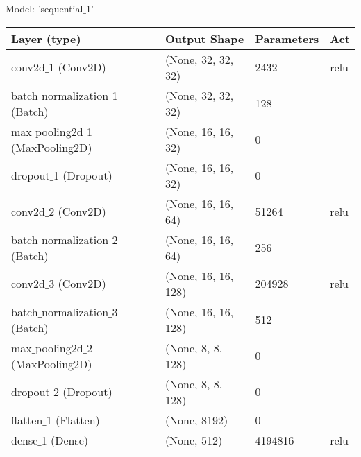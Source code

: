 \documentclass[a4paper,12pt]{article}
\begin{document}
\begin{center}
	Model: 'sequential$\_$1'
\begin{tabular}{|l l l l|}\hline
	\hline
	Layer (type)                  & Output Shape       & Parameters & Act\\ \hline \hline
	conv2d$\_$1 (Conv2D)             & (None, 32, 32, 32)    & 2432  & relu\\ \hline
	batch$\_$normalization$\_$1 (Batch) & (None, 32, 32, 32)    & 128   &\\ \hline
	max$\_$pooling2d$\_$1 (MaxPooling2D) & (None, 16, 16, 32)    & 0   &\\ \hline
	dropout$\_$1 (Dropout) & (None, 16, 16, 32)    & 0   &\\ \hline
	conv2d$\_$2 (Conv2D)             & (None, 16, 16, 64)    & 51264   & relu\\ \hline
	batch$\_$normalization$\_$2 (Batch) & (None, 16, 16, 64)    & 256  & \\ \hline
	conv2d$\_$3 (Conv2D) & (None, 16, 16, 128)    & 204928   & relu \\ \hline
	batch$\_$normalization$\_$3 (Batch) & (None, 16, 16, 128)    & 512  & \\ \hline
	max$\_$pooling2d$\_$2 (MaxPooling2D) & (None, 8, 8, 128)    & 0  & \\ \hline
	dropout$\_$2 (Dropout) & (None, 8, 8, 128)    & 0   &\\ \hline
	flatten$\_$1 (Flatten) & (None, 8192)    & 0   &\\ \hline
	dense$\_$1 (Dense) & (None, 512)    & 4194816   & relu \\ \hline

\end{tabular}
\end{center}
\end{document}
